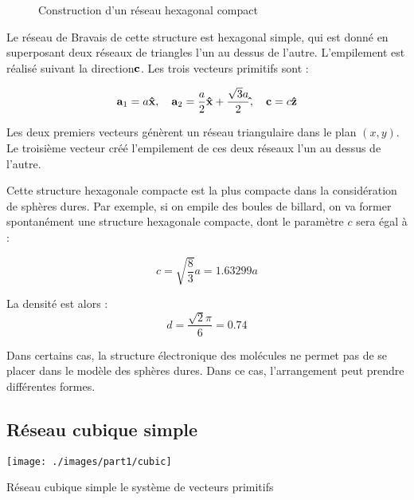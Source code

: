  \begin{figure}
     \hfill
    \caption{Construction d'un réseau hexagonal compact}
    \label{fig:hcp}
\end{figure}

Le réseau de Bravais de cette structure est hexagonal simple, qui est donné en
superposant deux réseaux de triangles l'un au dessus de l'autre. L'empilement est
réalisé suivant la direction$\mathbf{c}$. Les trois vecteurs primitifs sont :

\begin{equation}
    \mathbf{a}_1 = a \mathbf{\hat{x}},\quad \mathbf{a}_2 = \frac{a}{2}\mathbf{\hat{x}}+\frac{\sqrt{3}a}{2}\mathbf{\hat{}},\quad \mathbf{c}= c\mathbf{\hat{z}}
\end{equation}

Les deux premiers vecteurs génèrent un réseau triangulaire dans le plan $(x,y)$. Le troisième vecteur créé l'empilement de ces deux réseaux l'un au dessus de l'autre.

Cette structure hexagonale compacte est la plus compacte dans la considération de sphères dures. Par exemple, si on empile des boules de billard, on va former spontanément une structure hexagonale compacte, dont le paramètre $c$ sera égal à :

\begin{equation}
    c = \sqrt{\frac{8}{3}}a = 1.63299 a
\end{equation}

La densité est alors :
\begin{equation}
d = \frac{\sqrt{2}\pi}{6} = 0.74
\end{equation}

Dans certains cas, la structure électronique des molécules ne permet pas de se placer dans le modèle des sphères dures. Dans ce cas, l'arrangement peut prendre différentes formes.

\subsection{Réseau cubique simple}

\begin{marginfigure}
    \texttt{[image: ./images/part1/cubic]}
    \caption{Réseau cubique simple le système de vecteurs primitifs}
    \label{fig:sc}
\end{marginfigure}

